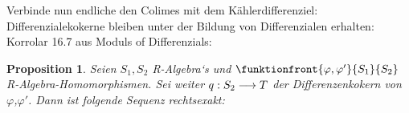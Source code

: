 \documentclass[10pt,a4paper]{report}
\newtheorem{prop}[satz]{Proposition}
\newcommand{\functionfront}[3]{\nolinebreak{#1:#2 \longrightarrow #3}}
\begin{document}
Verbinde nun endliche den Colimes mit dem Kählerdifferenziel:\\
Differenzialekokerne bleiben unter der Bildung von Differenzialen erhalten:
Korrolar 16.7 aus Moduls of Differenzials:
\begin{prop}
Seien $S_1,S_2$ R-Algebra`s und $\funktionfront{\varphi,\varphi'}{S_1}{S_2}$ R-Algebra-Homomorphismen. Sei weiter $\functionfront{q}{S_2}{T}$ der Differenzenkokern von $\varphi$,$\varphi '$.
Dann ist folgende Sequenz rechtsexakt:

\end{prop}
\end{document}
